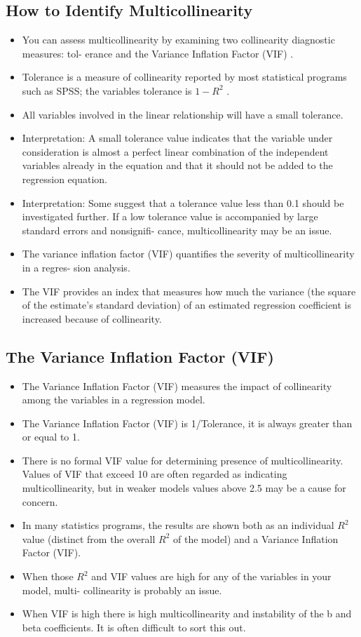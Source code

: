 \documentclass[a4paper,12pt]{article}
\begin{document}
\subsection{How to Identify Multicollinearity}
\begin{itemize}
\item You can assess multicollinearity by examining two collinearity diagnostic measures: tol-
erance and the Variance Inflation Factor (VIF) .
\item Tolerance is a measure of collinearity reported by most statistical programs such as SPSS;
the variables tolerance is $1 − R^2$ .
\item All variables involved in the linear relationship will have a small tolerance.
\item Interpretation: A small tolerance value indicates that the variable under consideration
is almost a perfect linear combination of the independent variables already in the equation
and that it should not be added to the regression equation.
\item Interpretation: Some suggest that a tolerance value less than 0.1 should be investigated
further. If a low tolerance value is accompanied by large standard errors and nonsignifi-
cance, multicollinearity may be an issue.
\item The variance inflation factor (VIF) quantifies the severity of multicollinearity in a regres-
sion analysis.
\item The VIF provides an index that measures how much the variance (the square of the
estimate’s standard deviation) of an estimated regression coefficient is increased because
of collinearity.
\end{itemize}
\subsection*{ The Variance Inflation Factor (VIF)}
\begin{itemize}
\item The Variance Inflation Factor (VIF) measures the impact of collinearity among the variables in a regression model.
\item The Variance Inflation Factor (VIF) is 1/Tolerance, it is always greater than or equal to
1.
\item There is no formal VIF value for determining presence of multicollinearity. Values of VIF
that exceed 10 are often regarded as indicating multicollinearity, but in weaker models
values above 2.5 may be a cause for concern.
\item In many statistics programs, the results are shown both as an individual $R^2$ value (distinct
from the overall $R^2$ of the model) and a Variance Inflation Factor (VIF).
\item When those $R^2$ and VIF values are high for any of the variables in your model, multi-
collinearity is probably an issue.

\item When VIF is high there is high multicollinearity and instability of the b and beta coefficients. It is often difficult to sort this out. 




\end{itemize}
\end{document}
